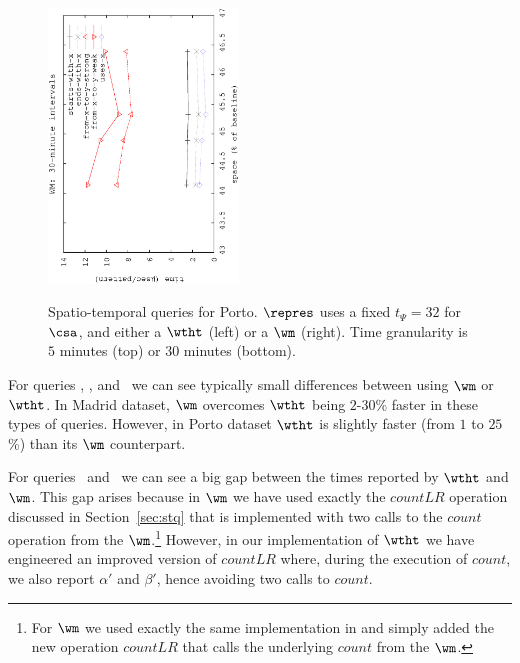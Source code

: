 \begin{figure}[!ht]
\begin{center}
		{\includegraphics[angle=-90,width=0.45\textwidth]{figures_synt/porto_wm30.eps}}
		
		
		
	\end{center}
	\vspace{-0.3cm}
	\caption{Spatio-temporal queries for Porto. $\repres$ uses a fixed $t_{\Psi}=32$ for $\csa$, 
		and either a $\wtht$ (left) or a $\wm$ (right). 
		Time granularity is $5$ minutes (top) or $30$ minutes (bottom). 
	}
	\label{fig:portost}
\end{figure}





For queries \Tswx, \Tewx, and \Tux\ we can see typically small differences between using $\wm$ or $\wtht$. In 
Madrid dataset, $\wm$ overcomes $\wtht$ being $2$-$30$\% faster in these types of queries. 
However, in Porto dataset $\wtht$ is slightly 
faster (from $1$ to $25$\%) than its $\wm$ counterpart.

For queries \Tfxtys\ and \Tfxtyw\ we can see a big gap between the times reported by $\wtht$ and $\wm$.
This gap arises because in $\wm$ we have used exactly the $countLR$ operation discussed in Section~\ref{sec:stq}
that is implemented with two calls to the $count$ operation from the $\wm$.\footnote{For $\wm$ we used exactly the same 
	implementation in \cite{CNO15} and simply added the new operation $countLR$ that calls the underlying $count$ from the
	$\wm$. }  
However, in our implementation of
$\wtht$ we have engineered an improved version of $countLR$ where, during the execution of $count$, we also report
$\alpha'$ and  $\beta'$, hence avoiding two calls to $count$.
 
